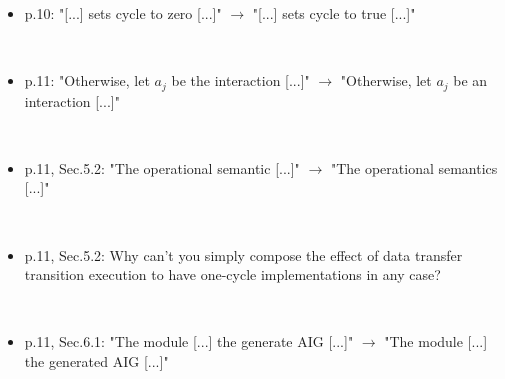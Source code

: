 \begin{itemize}
~

\done


\item p.10: "[...] sets cycle to zero [...]" $\rightarrow$ "[...] sets cycle to true [...]"

~

\done

\item p.11: "Otherwise, let $a_j$ be the interaction [...]" $\rightarrow$ "Otherwise, let $a_j$ 
be an interaction [...]"

~

\done
\item p.11, Sec.5.2: "The operational semantic [...]" $\rightarrow$ "The operational 
semantics [...]"

~

\done
\item p.11, Sec.5.2: Why can't you simply compose the effect of data transfer 
transition execution to have one-cycle implementations in any case?

~



\item p.11, Sec.6.1: "The module [...] the generate AIG [...]" $\rightarrow$ "The module 
[...] the generated AIG [...]"

~

\done
\end{itemize}
